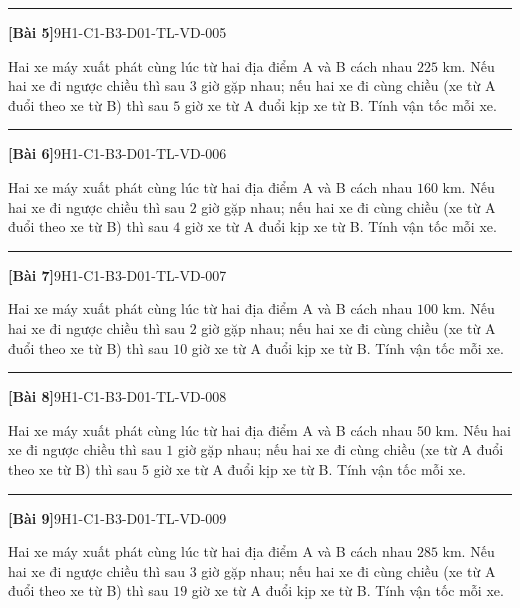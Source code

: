 \documentclass[12pt,a4paper]{article}
\newif\ifloigiai
\newenvironment{cauhoi}[2]{%
  \par\medskip\noindent\rule{\textwidth}{0.4pt}\par\nopagebreak
  \noindent\textbf{[#1]}\hfill{\scriptsize\ttfamily #2}\par\nopagebreak\smallskip}{\par}
\newcommand{\loigiai}[1]{\ifloigiai\par\smallskip\noindent\textit{Lời giải.} #1\par\fi}
\begin{document}
\begin{cauhoi}{Bài 5}{9H1-C1-B3-D01-TL-VD-005}
Hai xe máy xuất phát cùng lúc từ hai địa điểm A và B cách nhau $225$ km. Nếu hai xe đi ngược chiều thì sau $3$ giờ gặp nhau; nếu hai xe đi cùng chiều (xe từ A đuổi theo xe từ B) thì sau $5$ giờ xe từ A đuổi kịp xe từ B. Tính vận tốc mỗi xe.
\loigiai{Gọi vận tốc xe từ A là $x$ (km/h) và xe từ B là $y$ (km/h), $x>y>0$. Đi ngược chiều: $3(x+y)=225$, tức là $x+y=75$. Đi cùng chiều: $5(x-y)=225$, tức là $x-y=45$. Giải hệ ta được $x=60$, $y=15$ (thoả mãn). Vậy vận tốc xe từ A là 60 km/h, xe từ B là 15 km/h.}
\end{cauhoi}
\begin{cauhoi}{Bài 6}{9H1-C1-B3-D01-TL-VD-006}
Hai xe máy xuất phát cùng lúc từ hai địa điểm A và B cách nhau $160$ km. Nếu hai xe đi ngược chiều thì sau $2$ giờ gặp nhau; nếu hai xe đi cùng chiều (xe từ A đuổi theo xe từ B) thì sau $4$ giờ xe từ A đuổi kịp xe từ B. Tính vận tốc mỗi xe.
\loigiai{Gọi vận tốc xe từ A là $x$ (km/h) và xe từ B là $y$ (km/h), $x>y>0$. Đi ngược chiều: $2(x+y)=160$, tức là $x+y=80$. Đi cùng chiều: $4(x-y)=160$, tức là $x-y=40$. Giải hệ ta được $x=60$, $y=20$ (thoả mãn). Vậy vận tốc xe từ A là 60 km/h, xe từ B là 20 km/h.}
\end{cauhoi}
\begin{cauhoi}{Bài 7}{9H1-C1-B3-D01-TL-VD-007}
Hai xe máy xuất phát cùng lúc từ hai địa điểm A và B cách nhau $100$ km. Nếu hai xe đi ngược chiều thì sau $2$ giờ gặp nhau; nếu hai xe đi cùng chiều (xe từ A đuổi theo xe từ B) thì sau $10$ giờ xe từ A đuổi kịp xe từ B. Tính vận tốc mỗi xe.
\loigiai{Gọi vận tốc xe từ A là $x$ (km/h) và xe từ B là $y$ (km/h), $x>y>0$. Đi ngược chiều: $2(x+y)=100$, tức là $x+y=50$. Đi cùng chiều: $10(x-y)=100$, tức là $x-y=10$. Giải hệ ta được $x=30$, $y=20$ (thoả mãn). Vậy vận tốc xe từ A là 30 km/h, xe từ B là 20 km/h.}
\end{cauhoi}
\begin{cauhoi}{Bài 8}{9H1-C1-B3-D01-TL-VD-008}
Hai xe máy xuất phát cùng lúc từ hai địa điểm A và B cách nhau $50$ km. Nếu hai xe đi ngược chiều thì sau $1$ giờ gặp nhau; nếu hai xe đi cùng chiều (xe từ A đuổi theo xe từ B) thì sau $5$ giờ xe từ A đuổi kịp xe từ B. Tính vận tốc mỗi xe.
\loigiai{Gọi vận tốc xe từ A là $x$ (km/h) và xe từ B là $y$ (km/h), $x>y>0$. Đi ngược chiều: $(x+y)=50$, tức là $x+y=50$. Đi cùng chiều: $5(x-y)=50$, tức là $x-y=10$. Giải hệ ta được $x=30$, $y=20$ (thoả mãn). Vậy vận tốc xe từ A là 30 km/h, xe từ B là 20 km/h.}
\end{cauhoi}
\begin{cauhoi}{Bài 9}{9H1-C1-B3-D01-TL-VD-009}
Hai xe máy xuất phát cùng lúc từ hai địa điểm A và B cách nhau $285$ km. Nếu hai xe đi ngược chiều thì sau $3$ giờ gặp nhau; nếu hai xe đi cùng chiều (xe từ A đuổi theo xe từ B) thì sau $19$ giờ xe từ A đuổi kịp xe từ B. Tính vận tốc mỗi xe.
\loigiai{Gọi vận tốc xe từ A là $x$ (km/h) và xe từ B là $y$ (km/h), $x>y>0$. Đi ngược chiều: $3(x+y)=285$, tức là $x+y=95$. Đi cùng chiều: $19(x-y)=285$, tức là $x-y=15$. Giải hệ ta được $x=55$, $y=40$ (thoả mãn). Vậy vận tốc xe từ A là 55 km/h, xe từ B là 40 km/h.}
\end{cauhoi}
\end{document}
